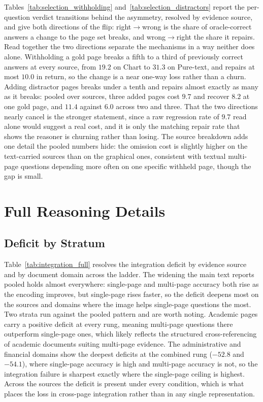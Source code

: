 Tables~\ref{tab:selection_withholding} and~\ref{tab:selection_distractors} report the per-question verdict transitions behind the asymmetry, resolved by evidence source, and give both directions of the flip: right$\rightarrow$wrong is the share of oracle-correct answers a change to the page set breaks, and wrong$\rightarrow$right the share it repairs. Read together the two directions separate the mechanisms in a way neither does alone. Withholding a gold page breaks a fifth to a third of previously correct answers at every source, from $19.2$ on Chart to $31.3$ on Pure-text, and repairs at most $10.0$ in return, so the change is a near one-way loss rather than a churn. Adding distractor pages breaks under a tenth and repairs almost exactly as many as it breaks: pooled over sources, three added pages cost $9.7$ and recover $8.2$ at one gold page, and $11.4$ against $6.0$ across two and three. That the two directions nearly cancel is the stronger statement, since a raw regression rate of $9.7$ read alone would suggest a real cost, and it is only the matching repair rate that shows the reasoner is churning rather than losing. The source breakdown adds one detail the pooled numbers hide: the omission cost is slightly higher on the text-carried sources than on the graphical ones, consistent with textual multi-page questions depending more often on one specific withheld page, though the gap is small.






\section{Full Reasoning Details}
\label{app:add_reasoning}

\subsection{Deficit by Stratum}
\label{app:integration_strata}

Table~\ref{tab:integration_full} resolves the integration deficit by evidence source and by document domain across the ladder. The widening the main text reports pooled holds almost everywhere: single-page and multi-page accuracy both rise as the encoding improves, but single-page rises faster, so the deficit deepens most on the sources and domains where the image helps single-page questions the most. Two strata run against the pooled pattern and are worth noting. Academic pages carry a positive deficit at every rung, meaning multi-page questions there outperform single-page ones, which likely reflects the structured cross-referencing of academic documents suiting multi-page evidence. The administrative and financial domains show the deepest deficits at the combined rung ($-52.8$ and $-54.1$), where single-page accuracy is high and multi-page accuracy is not, so the integration failure is sharpest exactly where the single-page ceiling is highest. Across the sources the deficit is present under every condition, which is what places the loss in cross-page integration rather than in any single representation.

